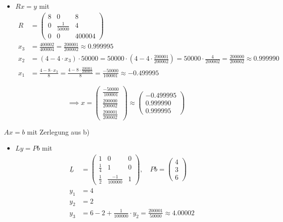 \documentclass[12pt]{scrartcl}
\begin{document}
\begin{enumAlph}
\begin{itemize}
    \item[II.] $Rx=y$ mit
        \[
        \begin{aligned}
        R &= \begin{pmatrix}
            8 & 0 & 8 \\
            0 & \frac{1}{50000} & 4 \\
            0 & 0 & 400004
        \end{pmatrix}
        \\
        x_3 &= \frac{400002}{400004}=\frac{200001}{200002}\approx 0.999995 \\
        x_2 &= (4-4\cdot x_3)\cdot 50000 = 50000\cdot (4-4\cdot \frac{200001}{200002})=50000\cdot \frac{4}{200002}=\frac{200000}{200002}\approx 0.999990 \\
        x_1 &= \frac{4-8\cdot x_3}{8} = \frac{4-8\cdot \frac{200001}{200002}}{8} = \frac{-50000}{100001}\approx -0.499995
        \end{aligned}
        \]

    
    \end{itemize}

        \[
            \implies x=\begin{pmatrix}
                \frac{-50000}{100001} \\[6pt] \frac{200000}{200002} \\[6pt] \frac{200001}{200002}
                    \end{pmatrix}\approx \begin{pmatrix}
                        -0.499995 \\ 0.999990 \\ 0.999995
                    \end{pmatrix}
        \]

\newpage
\item  $Ax=b$ mit Zerlegung aus b)\\
\begin{itemize}

    \item[I.] $Ly = Pb$ mit 
        \[
        \begin{aligned}
        \underline{L} &= \begin{pmatrix}
            1 & 0 & 0 \\
            \frac{1}{4} & 1 & 0 \\
            \frac{1}{2} & \frac{-1}{100000} & 1
        \end{pmatrix}, \quad
        Pb = \begin{pmatrix}
            4 \\ 3 \\ 6 
        \end{pmatrix}
        \\
        y_1 &= 4 \\
        y_2 &= 2 \\
        y_3 &= 6-2+\frac{1}{100 000}\cdot y_2= \frac{200001}{50000}\approx 4.00002
        \end{aligned}
        \]


\end{itemize}
\end{enumAlph}
\end{document}
